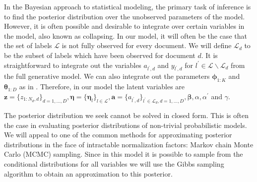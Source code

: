 
\label{sec:inference} In the Bayesian approach to statistical modeling,
the primary task of inference is to find the posterior distribution
over the unobserved parameters of the model. However, it is often
possible and desirable to integrate over certain variables in the
model, also known as collapsing. In our model, it will often be the
case that the set of labels $\mathcal{L}$ is not fully observed for
every document. We will define $\mathcal{L}_{d}$ to be the subset
of labels which have been observed for document $d$. It is straightforward
to integrate out the variables $a_{l^{\prime},d}$ and $y_{l^{\prime},d}$
for $l^{\prime}\in\mathcal{L}\backslash\mathcal{L}_{d}$ from the
full generative model. We can also integrate out the parameters $\boldsymbol{\phi}_{1:K}$
and $\boldsymbol{\theta}_{1:D}$ as in \citet{Griffiths04}. Therefore,
in our model the latent variables are $\mathbf{z}=\{z_{1:N_{d},d}\}_{d=1,\ldots,D},\boldsymbol\eta=\{\boldsymbol\eta_{l}\}_{l\in\mathcal{L}},\mathbf{a}=\{a_{l^{\prime},d}\}_{l^{\prime}\in\mathcal{L}_{d},d=1,\ldots,D},\boldsymbol\beta,\alpha,\alpha^{\prime}$
and $\gamma$.

The posterior distribution we seek cannot be solved in closed form.
This is often the case in evaluating posterior distributions of non-trivial
probabilistic models. We will appeal to one of the common methods
for approximating posterior distributions in the face of intractable
normalization factors: Markov chain Monte Carlo (MCMC) sampling. Since
in this model it is possible to sample from the conditional distributions
for all variables we will use the Gibbs sampling algorithm to obtain
an approximation to this posterior. %



